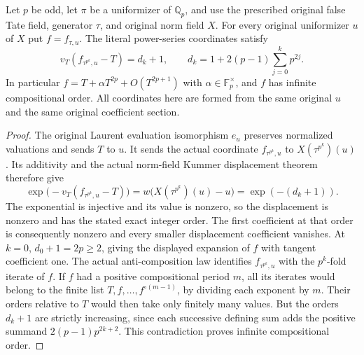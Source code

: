 \begin{lemma}
\label{ft:norm-field-action-profile}
\leanok
{}
Let $p$ be odd, let $\pi$ be a uniformizer of $\mathbb Q_p$, and use
the prescribed original false Tate field, generator $\tau$, and original
norm field $X$. For every original uniformizer $u$ of $X$ put
$f=f_{\tau,u}$. The literal power-series coordinates satisfy
\[
 v_T(f_{\tau^{p^k},u}-T)=d_k+1,\qquad
 d_k=1+2(p-1)\sum_{j=0}^k p^{2j}.
\]
In particular $f=T+\alpha T^{2p}+O(T^{2p+1})$ with
$\alpha\in\mathbb F_p^\times$, and $f$ has infinite compositional order.
All coordinates here are formed from the same original $u$ and the same
original coefficient section.
\end{lemma}
\begin{proof}
The original Laurent evaluation isomorphism $e_u$ preserves normalized
valuations and sends $T$ to $u$. It sends the actual coordinate
$f_{\tau^{p^k},u}$ to $X(\tau^{p^k})(u)$. Its additivity and the actual
norm-field Kummer displacement theorem therefore give
\[
 \exp\bigl(-v_T(f_{\tau^{p^k},u}-T)\bigr)
 =w\bigl(X(\tau^{p^k})(u)-u\bigr)=\exp(-(d_k+1)).
\]
The exponential is injective and its value is nonzero, so the displacement
is nonzero and has the stated exact integer order. The first coefficient
at that order is consequently nonzero and every smaller displacement
coefficient vanishes. At $k=0$, $d_0+1=2p\geq2$, giving the displayed
expansion of $f$ with tangent coefficient one.
The actual anti-composition law identifies $f_{\tau^{p^k},u}$ with the
$p^k$-fold iterate of $f$. If $f$ had a positive compositional period $m$,
all its iterates would belong to the finite list
$T,f,\ldots,f^{\circ(m-1)}$, by dividing each exponent by $m$.
Their orders relative to $T$ would then take only finitely many values.
But the orders $d_k+1$ are strictly increasing, since each successive
defining sum adds the positive summand $2(p-1)p^{2k+2}$.
This contradiction proves infinite compositional order.
\end{proof}

